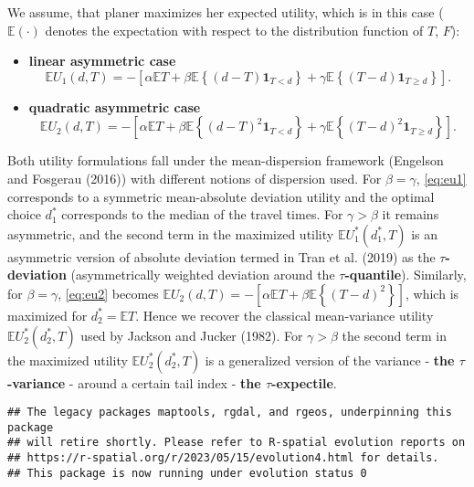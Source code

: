\documentclass[
]{article}
\theoremstyle{definition}
\theoremstyle{definition}
\theoremstyle{definition}
\theoremstyle{definition}
\theoremstyle{remark}
\begin{document}
We assume, that planer maximizes her expected utility, which is in this case (\(\mathbb E(\cdot)\) denotes the expectation with respect to the distribution function of \(T\), \(F\)):

\begin{itemize}
\item
  \textbf{linear asymmetric case}
  \begin{equation}\mathbb EU_1(d,T) = -\left[\alpha \mathbb ET + \beta\mathbb E\left\{(d-T)\mathbf 1_{T<d} \right\}+ \gamma \mathbb E\left\{(T-d)\mathbf 1_{T\geq d}\right\}\right]. \label{eq:eu1}
  \end{equation}
\item
  \textbf{quadratic asymmetric case}
  \begin{equation}
  \mathbb EU_2(d,T) = -\left[\alpha \mathbb ET + \beta\mathbb E\left\{(d-T)^2\mathbf 1_{T<d} \right\}+ \gamma \mathbb E\left\{(T-d)^2\mathbf 1_{T\geq d}\right\}\right]. \label{eq:eu2}
  \end{equation}
\end{itemize}

Both utility formulations fall under the mean-dispersion framework (Engelson and Fosgerau (2016)) with different notions of dispersion used. For \(\beta=\gamma\), \eqref{eq:eu1} corresponds to a symmetric mean-absolute deviation utility and the optimal choice \(d^*_1\) corresponds to the median of the travel times. For \(\gamma>\beta\) it remains asymmetric, and the second term in the maximized utility \(\mathbb EU^*_1(d_1^*,T)\) is an asymmetric version of absolute deviation termed in Tran et al. (2019) as the \textbf{\(\tau\)-deviation} (asymmetrically weighted deviation around the \textbf{\(\tau\)-quantile}). Similarly, for \(\beta=\gamma\), \eqref{eq:eu2} becomes \(\mathbb EU_2(d,T) = -\left[\alpha \mathbb ET + \beta\mathbb E\left\{(T-d)^2\right\}\right]\),
which is maximized for \(d_2^* = \mathbb ET\). Hence we recover the classical mean-variance utility \(\mathbb EU^*_2(d_2^*,T)\) used by Jackson and Jucker (1982). For \(\gamma>\beta\) the second term in the maximized utility \(\mathbb EU^*_2(d_2^*,T)\) is a generalized version of the variance - \textbf{the \(\tau\)-variance} - around a certain tail index - \textbf{the \(\tau\)-expectile}.

\begin{verbatim}
## The legacy packages maptools, rgdal, and rgeos, underpinning this package
## will retire shortly. Please refer to R-spatial evolution reports on
## https://r-spatial.org/r/2023/05/15/evolution4.html for details.
## This package is now running under evolution status 0
\end{verbatim}
\end{document}
